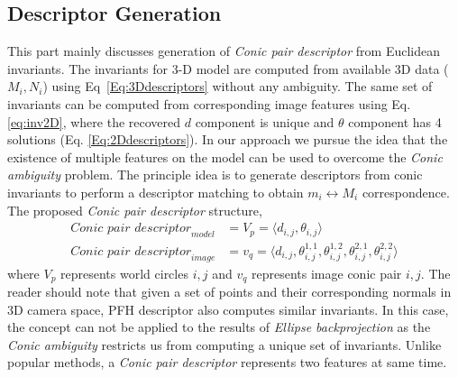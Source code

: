 \documentclass{bmvc2k}
\newcommand{\eref}[1]{Eq\bmvaOneDot~\ref{#1}}
\begin{document}
\subsection{Descriptor Generation}\label{ssec:descriptor}
This part mainly discusses generation of \textit{Conic pair descriptor} from Euclidean invariants. 
The invariants for 3-D model are computed from available 3D data ($M_i,N_i$) using \eref{Eq:3Ddescriptors} without any ambiguity.
The same set of invariants can be computed from corresponding image features using Eq. \ref{eq:inv2D}, where the recovered $ d $ component is unique and $ \theta $ component has 4 solutions (Eq. \ref{Eq:2Ddescriptors}). 
In our approach we pursue the idea that the existence of multiple features on the model can be used to overcome the \textit{Conic ambiguity} problem. 
The principle idea is to generate descriptors from conic invariants to perform a descriptor matching to obtain $ m_i \leftrightarrow M_i $ correspondence.
The proposed \textit{Conic pair descriptor} structure,
\begin{align}
\textit{Conic pair descriptor}_{model} &= V_{p} = \langle d_{i,j},\theta_{i,j} \rangle \label{Eq:3Ddescriptors} \\
\textit{Conic pair descriptor}_{image} &= v_{q} = 
			\langle  d_{i,j},\theta_{i,j}^{1,1},\theta_{i,j}^{1,2},\theta_{i,j}^{2,1},\theta_{i,j}^{2,2} \rangle \label{Eq:2Ddescriptors} 
\end{align}
where $V_{p}$ represents world circles $i,j$ and $v_{q}$ represents image conic pair $i,j$. 
The reader should note that given a set of points and their corresponding normals in 3D camera space, PFH descriptor \cite{RusuDoctoralDissertation} also computes similar invariants.
In this case, the concept can not be applied to the results of \textit{Ellipse backprojection} as the \textit{Conic ambiguity} restricts us from computing a unique set of invariants. 
Unlike popular methods, a \textit{Conic pair descriptor} represents two features at same time. 
\end{document}
